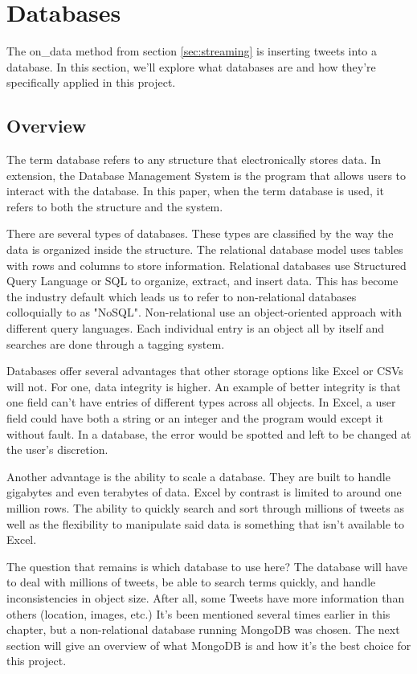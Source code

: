 \documentclass[11pt, twoside, reqno]{book}
\begin{document}
\section{Databases}
\hspace{0.2in} The on\_data method from section \ref{sec:streaming} is inserting tweets into a database. In this section, we'll explore what databases are and how they're specifically applied in this project.
\subsection{Overview}
The term database refers to any structure that electronically stores data. In extension, the Database Management System is the program that allows users to interact with the database. In this paper, when the term database is used, it refers to both the structure and the system. 

There are several types of databases. These types are classified by the way the data is organized inside the structure. The relational database model uses tables with rows and columns to store information. Relational databases use Structured Query Language or SQL to organize, extract, and insert data. This has become the industry default which leads us to refer to non-relational databases colloquially to as "NoSQL". Non-relational use an object-oriented approach with different query languages. Each individual entry is an object all by itself and searches are done through a tagging system\cite{connolly_begg_2014}. 

Databases offer several advantages that other storage options like Excel or CSVs will not. For one, data integrity is higher. An example of better integrity is that one field can't have entries of different types across all objects\cite{connolly_begg_2014}. In Excel, a user field could have both a string or an integer and the program would except it without fault. In a database, the error would be spotted and left to be changed at the user's discretion.

Another advantage is the ability to scale a database. They are built to handle gigabytes and even terabytes of data. Excel by contrast is limited to around one million rows\cite{connolly_begg_2014}. The ability to quickly search and sort through millions of tweets as well as the flexibility to manipulate said data is something that isn't available to Excel.

The question that remains is which database to use here? The database will have to deal with millions of tweets, be able to search terms quickly, and handle inconsistencies in object size. After all, some Tweets have more information than others (location, images, etc.) It's been mentioned several times earlier in this chapter, but a non-relational database running MongoDB was chosen. The next section will give an overview of what MongoDB is and how it's the best choice for this project. 
\end{document}
